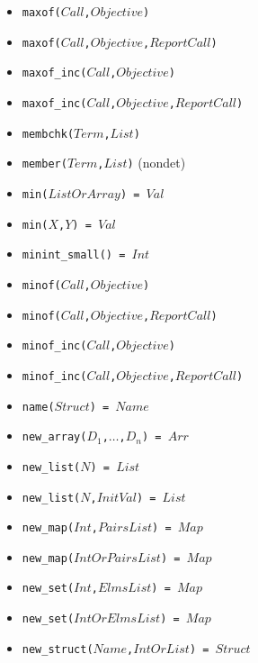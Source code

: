 \documentclass[10pt]{article}
\begin{document}
\begin{multicols}{2}
\begin{scriptsize}
\begin{itemize}
    \item \texttt{maxof($Call$,$Objective$)} 
    \item \texttt{maxof($Call$,$Objective$,$ReportCall$)} 
    \item \texttt{maxof\_inc($Call$,$Objective$)} 
    \item \texttt{maxof\_inc($Call$,$Objective$,$ReportCall$)} 
    \item \texttt{membchk($Term$,$List$)} 
    \item \texttt{member($Term$,$List$)} (nondet)
    \item \texttt{min($ListOrArray$) = $Val$} 
    \item \texttt{min($X$,$Y$) = $Val$} 
    \item \texttt{minint\_small() = $Int$}
    \item \texttt{minof($Call$,$Objective$)} 
    \item \texttt{minof($Call$,$Objective$,$ReportCall$)} 
    \item \texttt{minof\_inc($Call$,$Objective$)} 
    \item \texttt{minof\_inc($Call$,$Objective$,$ReportCall$)} 
    \item \texttt{name($Struct$) = $Name$} 
    \item \texttt{new\_array($D_1$,$\ldots$,$D_n$) = $Arr$} 
    \item \texttt{new\_list($N$) = $List$} 
    \item \texttt{new\_list($N$,$InitVal$) = $List$} 
    \item \texttt{new\_map($Int$,$PairsList$) = $Map$} 
    \item \texttt{new\_map($IntOrPairsList$) = $Map$} 
    \item \texttt{new\_set($Int$,$ElmsList$) = $Map$} 
    \item \texttt{new\_set($IntOrElmsList$) = $Map$} 
    \item \texttt{new\_struct($Name$,$IntOrList$) = $Struct$} 

\end{itemize}
\end{scriptsize}
\end{multicols}
\end{document}
